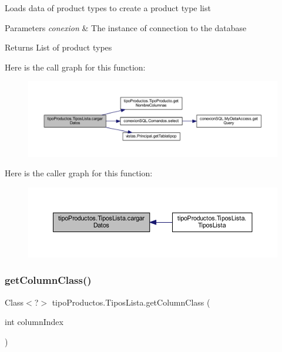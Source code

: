 Loads data of product types to create a product type list 
\begin{DoxyParams}{Parameters}
{\em conexion} & The instance of connection to the database \\
\hline
\end{DoxyParams}
\begin{DoxyReturn}{Returns}
List of product types 
\end{DoxyReturn}
Here is the call graph for this function\+:
\nopagebreak
\begin{figure}[H]
\begin{center}
\leavevmode
\includegraphics[width=350pt]{classtipo_productos_1_1_tipos_lista_ad36441dd4c32340b0905b5d30b91fcb4_cgraph}
\end{center}
\end{figure}
Here is the caller graph for this function\+:
\nopagebreak
\begin{figure}[H]
\begin{center}
\leavevmode
\includegraphics[width=350pt]{classtipo_productos_1_1_tipos_lista_ad36441dd4c32340b0905b5d30b91fcb4_icgraph}
\end{center}
\end{figure}
\mbox{\label{classtipo_productos_1_1_tipos_lista_a87b924c7d8f72e7615286c41d19c2589}} 
\subsubsection{\texorpdfstring{get\+Column\+Class()}{getColumnClass()}}
{\footnotesize\ttfamily Class$<$?$>$ tipo\+Productos.\+Tipos\+Lista.\+get\+Column\+Class (\begin{DoxyParamCaption}\item[{int}]{column\+Index }\end{DoxyParamCaption})}

